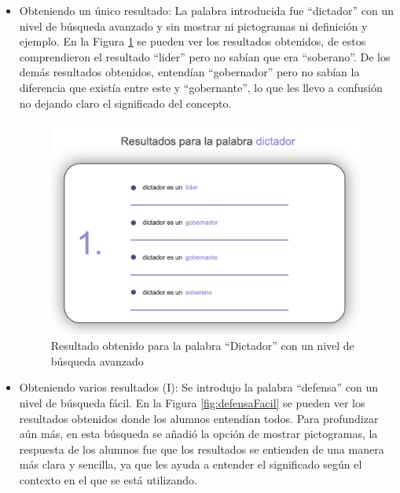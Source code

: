 \begin{itemize}
	\item Obteniendo un único resultado: La palabra introducida fue ``dictador'' con un nivel de búsqueda avanzado y sin mostrar ni pictogramas ni definición y ejemplo. En la Figura \ref{fig:dictadorAvanzado} se pueden ver los resultados obtenidos, de estos comprendieron el resultado ``lider'' pero no sabían que era ``soberano''. De los demás resultados obtenidos, entendían ``gobernador'' pero no sabían la diferencia que existía entre este y ``gobernante'', lo que les llevo a confusión no dejando claro el significado del concepto.
	
	\begin{figure}[!h]
		\includegraphics[width=.7\textwidth]{Imagenes/Bitmap/Capitulo4/EvaluacionFinal/4dictadoravanzado.png}
		\centering
		\caption{Resultado obtenido para la palabra ``Dictador'' con un nivel de búsqueda avanzado}
		\label{fig:dictadorAvanzado}
	\end{figure}
	
	\item Obteniendo varios resultados (I):  Se introdujo la palabra ``defensa'' con un nivel de búsqueda fácil. En la Figura \ref{fig:defensaFacil} se pueden ver los resultados obtenidos donde los alumnos entendían todos. Para profundizar aún más, en esta búsqueda se añadió la opción de mostrar pictogramas, la respuesta de los alumnos fue que los resultados se entienden de una manera más clara y sencilla, ya que les ayuda a entender el significado según el contexto en el que se está utilizando.
	

\end{itemize}
